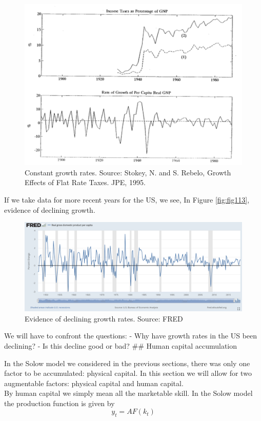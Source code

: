 \documentclass[
]{book}
\begin{document}
\begin{figure}
\includegraphics[width=1\linewidth]{img/ch1/growth12} \caption{Constant growth rates. Source: Stokey, N. and S. Rebelo, Growth Effects of Flat Rate Taxes. JPE, 1995.}\label{fig:fig112}
\end{figure}

If we take data for more recent years for the US, we see, In Figure \ref{fig:fig113}, evidence of declining growth.

\begin{figure}
\includegraphics[width=1\linewidth]{img/ch1/growth13} \caption{Evidence of declining growth rates. Source: FRED}\label{fig:fig13}
\end{figure}

We will have to confront the questions:
- Why have growth rates in the US been declining?
- Is this decline good or bad?
\#\# Human capital accumulation

In the Solow model we considered in the previous sections, there was only one factor to be accumulated: physical capital. In this section we will allow for two augmentable factors: physical capital and human capital.\\
By human capital we simply mean all the marketable skill. In the Solow model the production function is given by
\[y_t=A F(k_t)\]
\end{document}
